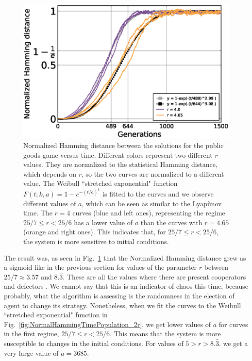 \begin{figure}
	\centering
	\includegraphics[width=1\linewidth]{Images/P3/NormalHammingTimePopulation_2r.eps}
	\caption{Normalized Hamming distance between the solutions for the public goods game versus time. Different colors represent two different $r$ values. They are normalized to the statistical Hamming distance, which depends on $r$, so the two curves are normalized to a different value. The Weibull ``stretched exponential" function $F(t;k,a)=1-e^{-(t/a)^k}$ is fitted to the curves and we observe different values of $a$, which can be seen as similar to the Lyapùnov time. The $r=4$ curves (blue and left ones), representing the regime $25/7\leq r<25/6$ has a lower value of $a$ than the curves with $r=4.65$ (orange and right ones). This indicates that, for $25/7\leq r<25/6$, the system is more sensitive to initial conditions.}
	\label{fig:NormalHammingTimePopulation_r}
\end{figure}


The result was, as seen in Fig.~\ref{fig:NormalHammingTimePopulation_r} that the Normalized Hamming distance grew as a sigmoid like in the previous section for values of the parameter $r$ between $25/7\approx3.57$ and $8.\hat3$. These are all the values where there are present cooperators and defectors . We cannot say that this is an indicator of chaos this time, because probably, what the algorithm is assessing is the randomness in the election of agent to change its strategy. Nonetheless, when we fit the curves to the Weibull ``stretched exponential" function in Fig.~\ref{fig:NormalHammingTimePopulation_2r}, we get lower values of $a$ for curves in the first regime, $25/7\leq r<25/6$. This means that the system is more susceptible to changes in the initial conditions. For values of $5>r>8.\hat3.$ we get a very large value of $a = 3685$.


